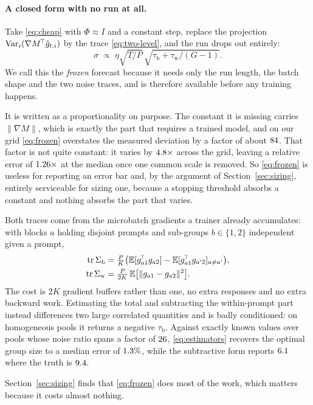 \paragraph{A closed form with no run at all.} Take \eqref{eq:cheap} with $\Phi \approx I$ and a
constant step, replace the projection $\operatorname{Var}_i(\nabla M^{\!\top}\hat g_{t,i})$ by the trace
\eqref{eq:two-level}, and the run drops out entirely:
\begin{equation}
  \label{eq:frozen}
  \sigma \;\propto\; \eta \sqrt{T/P}\,\sqrt{\tau_{\mathrm{b}} + \tau_{\mathrm{w}}/(G-1)}.
\end{equation}
We call this the \emph{frozen} forecast because it needs only the run length, the batch shape and
the two noise traces, and is therefore available before any training happens.

It is written as a proportionality on purpose. The constant it is missing carries
$\|\nabla M\|$, which is exactly the part that requires a trained model, and on our grid
\eqref{eq:frozen} overstates the measured deviation by a factor of about
$84$. That factor is not quite constant: it varies by
$4.8\times$ across the grid, leaving a relative error of
$1.26\times$ at the median once one common scale is removed. So
\eqref{eq:frozen} is useless for reporting an error bar and, by the argument of
Section~\ref{sec:sizing}, entirely serviceable for sizing one, because a stopping threshold absorbs
a constant and nothing absorbs the part that varies.

Both traces come from the microbatch gradients a trainer already accumulates: with blocks $a$ holding
disjoint prompts and sub-groups $b \in \{1,2\}$ independent given a prompt,
\begin{equation}
  \label{eq:estimators}
  \begin{aligned}
  \operatorname{tr}\Sigma_{\mathrm{b}} &= \tfrac{P}{K}\big( \mathbb{E}[ g_{a1}^{\!\top} g_{a2} ] - \mathbb{E}[ g_{a1}^{\!\top} g_{a'2} ]_{a \neq a'} \big),\\
  \operatorname{tr}\Sigma_{\mathrm{w}} &= \tfrac{P}{2K}\, \mathbb{E}\big[ \| g_{a1} - g_{a2} \|^2 \big].
  \end{aligned}
\end{equation}
The cost is $2K$ gradient buffers rather than one, no extra responses and no extra backward work.
Estimating the total and subtracting the within-prompt part instead differences two large
correlated quantities and is badly conditioned: on homogeneous pools it returns a negative
$\tau_{\mathrm{b}}$. Against exactly known values over pools whose noise ratio spans a factor of
$26$, \eqref{eq:estimators} recovers the optimal group size to a median error of
$1.3\%$, while the subtractive form reports $6.1$ where the truth is
$9.4$.

Section~\ref{sec:sizing} finds that \eqref{eq:frozen} does most of the work, which matters because
it costs almost nothing.
